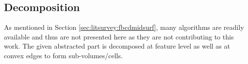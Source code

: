 \subsection{Decomposition}

As mentioned in Section \ref{sec:litsurvey:fbcdmidsurf}, many algorithms are readily available and thus are not presented here as they are not contributing to this work. The given abstracted part is decomposed at feature level as well as at convex edges to form sub-volumes/cells.


